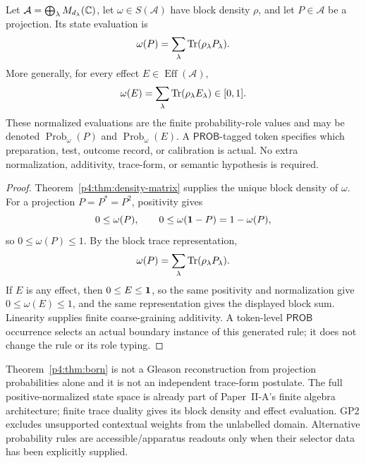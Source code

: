 \documentclass[12pt,a4paper]{article}
\begin{document}
\begin{theorem}
\label{p4:thm:born}
Let \(\mathcal A=\bigoplus_\lambda M_{d_\lambda}(\mathbb{C})\), let
\(\omega\in S(\mathcal A)\) have block density \(\rho\), and let
\(P\in\mathcal A\) be a projection.  Its state evaluation is
\begin{equation}
\label{p4:eq:born-projection}
\omega(P)=\sum_\lambda\operatorname{Tr}(\rho_\lambda P_\lambda).
\end{equation}
More generally, for every effect \(E\in\operatorname{Eff}(\mathcal A)\),
\begin{equation}
\label{p4:eq:born-effect}
\omega(E)=\sum_\lambda\operatorname{Tr}(\rho_\lambda E_\lambda)\in[0,1].
\end{equation}
These normalized evaluations are the finite probability-role values and may
be denoted \(\operatorname{Prob}_\omega(P)\) and
\(\operatorname{Prob}_\omega(E)\).  A \(\mathsf{PROB}\)-tagged token specifies
which preparation, test, outcome record, or calibration is actual.  No extra
normalization, additivity, trace-form, or semantic hypothesis is required.
\end{theorem}


\begin{proof}
Theorem~\ref{p4:thm:density-matrix} supplies the unique block density of
\(\omega\).  For a projection \(P=P^*=P^2\), positivity gives
\[
0\le \omega(P),
\qquad
0\le \omega(\mathbf{1}-P)=1-\omega(P),
\]
so \(0\le\omega(P)\le1\).  By the block trace representation,
\[
\omega(P)=\sum_\lambda\operatorname{Tr}(\rho_\lambda P_\lambda).
\]
If \(E\) is any effect, then \(0\le E\le\mathbf{1}\), so the same positivity and
normalization give \(0\le\omega(E)\le1\), and the same representation gives
the displayed block sum.  Linearity supplies finite coarse-graining
additivity.  A token-level \(\mathsf{PROB}\) occurrence selects an actual
boundary instance of this generated rule; it does not change the rule or its
role typing.
\end{proof}


\begin{remark}
\label{p4:rem:born-evaluation-status}
Theorem~\ref{p4:thm:born} is not a Gleason reconstruction from projection
probabilities alone and it is not an independent trace-form postulate.  The
full positive-normalized state space is already part of Paper~II-A's finite
algebra architecture; finite trace duality gives its block density and effect
evaluation.  GP2 excludes unsupported contextual weights from the unlabelled domain.
Alternative probability rules are accessible/apparatus readouts only
when their selector data has been explicitly supplied.
\end{remark}
\end{document}
